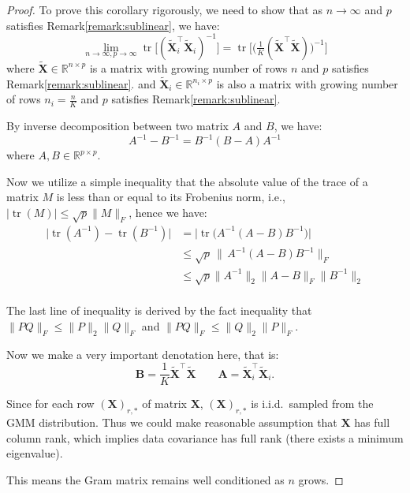\documentclass[11pt]{article}
\numberwithin{equation}{section}
\theoremstyle{plain}
\theoremstyle{definition}
\theoremstyle{remark}
\begin{document}
\begin{proof}
To prove this corollary rigorously, we need to show that as $n\to\infty$ and $p$ satisfies Remark\ref{remark:sublinear},
we have:
\[
\lim_{n\to\infty,p\to\infty}\operatorname{tr}\bigl[(\tilde{\mathbf{X}}_i^{\top}\tilde{\mathbf{X}}_i)^{-1}\bigr]
  = \operatorname{tr}\bigl[\bigl(\tfrac{1}{K}(\tilde{\mathbf{X}}^{\top}\tilde{\mathbf{X}})\bigr)^{-1}\bigr]
\]
where $\tilde{\mathbf{X}}\in\mathbb{R}^{n \times p}$ is a matrix with growing number of rows $n$ and $p$ satisfies Remark\ref{remark:sublinear}.
and $\tilde{\mathbf{X}}_i\in\mathbb{R}^{n_i \times p}$ is also a matrix with growing number of rows $n_i = \frac{n}{K}$ and $p$ satisfies Remark\ref{remark:sublinear}.

By inverse decomposition between two matrix $A$ and $B$, we have:
\[
A^{-1} - B^{-1} = B^{-1}(B-A)A^{-1}\]
where $A, B \in \mathbb{R}^{p\times p}$.

Now we utilize a simple inequality that the absolute value of the trace of a matrix $M$ is less than or equal to its Frobenius norm, i.e., $\lvert\operatorname{tr}(M)\rvert\le\sqrt{p}\lVert M\rVert_{F}$, hence we have:
\begin{align*}
  \bigl|\operatorname{tr}(A^{-1}) - \operatorname{tr}(B^{-1})\bigr|
  &= \bigl|\operatorname{tr}\!\bigl(A^{-1}(A-B)B^{-1}\bigr)\bigr| \\[4pt]
  &\le \sqrt{p} \,\bigl\|\,A^{-1}(A-B)B^{-1}\bigr\|_{F}\\[4pt]
  &\leq \sqrt{p} \lVert A^{-1}\rVert_{2} \lVert A-B\rVert_{F} \lVert B^{-1}\rVert_{2} \\[4pt]
  \tag{4.0} \label{eq:4.0}
\end{align*}

The last line of inequality is derived by the fact inequality that $\lVert PQ\rVert_{F} \le \lVert P\rVert_{2}\lVert Q\rVert_{F}$ and $\lVert PQ\rVert_{F} \le \lVert Q\rVert_{2}\lVert P\rVert_{F}$.

Now we make a very important denotation here, that is:
\[
 \mathbf{B} = \frac{1}{K} \tilde{\mathbf{X}}^{\top}\tilde{\mathbf{X}}  \qquad  \mathbf{A} = \tilde{\mathbf{X}}_i^{\top}\tilde{\mathbf{X}}_i.
\]

Since for each row $(\mathbf{X})_{r,*}$ of matrix $\mathbf{X}$, $(\mathbf{X})_{r,*}$ is i.i.d.\ sampled from the GMM distribution. Thus we could make reasonable assumption that $\mathbf{X}$ has full column rank, which implies data covariance has full rank (there exists a minimum eigenvalue).

This means the Gram matrix remains well conditioned as $n$ grows.


\end{proof}
\end{document}
